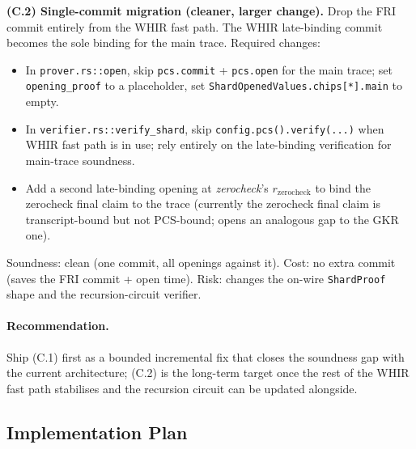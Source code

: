 \textbf{(C.2) Single-commit migration (cleaner, larger change).}
Drop the FRI commit entirely from the WHIR fast path.  The WHIR
late-binding commit becomes the sole binding for the main trace.
Required changes:
\begin{itemize}
  \item In \texttt{prover.rs::open}, skip \texttt{pcs.commit} +
        \texttt{pcs.open} for the main trace; set
        \texttt{opening\_proof} to a placeholder, set
        \texttt{ShardOpenedValues.chips[*].main} to empty.
  \item In \texttt{verifier.rs::verify\_shard}, skip
        \texttt{config.pcs().verify(...)} when WHIR fast path is in
        use; rely entirely on the late-binding verification for
        main-trace soundness.
  \item Add a second late-binding opening at \emph{zerocheck}'s
        $r_{\mathrm{zerocheck}}$ to bind the zerocheck final claim
        to the trace (currently the zerocheck final claim is
        transcript-bound but not PCS-bound; opens an analogous gap
        to the GKR one).
\end{itemize}
Soundness: clean (one commit, all openings against it).  Cost:
no extra commit (saves the FRI commit + open time).  Risk: changes
the on-wire \texttt{ShardProof} shape and the recursion-circuit
verifier.

\paragraph{Recommendation.}
Ship (C.1) first as a bounded incremental fix that closes the
soundness gap with the current architecture; (C.2) is the long-term
target once the rest of the WHIR fast path stabilises and the
recursion circuit can be updated alongside.

\subsection{Implementation Plan}

